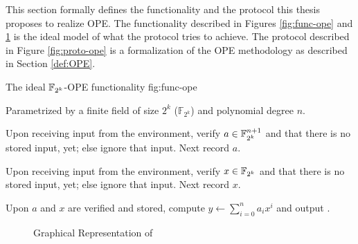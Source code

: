 %
%
\label{sec:protocol}

This section formally defines the functionality \JWfuncSymOPE and the protocol
\JWprotoSymOPE this thesis proposes to realize OPE.  The functionality described
in Figures \ref{fig:func-ope} and \ref{fig:graph-ope} is the ideal model of what
the protocol tries to achieve. The protocol described in Figure
\ref{fig:proto-ope} is a formalization of the OPE methodology as described in
Section \ref{def:OPE}.

\begin{JWfunc}%
  {\JWfuncSymOPE}%
  {The ideal $\mathbb{F}_{2^k}{}$-OPE functionality \JWfuncSymOPE{}}%
  {fig:func-ope}

  Parametrized by a finite field of size $2^k$ ($\mathbb{F}_{2^k}$)
  and polynomial degree $n$.

  \begin{JWfuncSteps}

  \item Upon receiving input  from the environment, verify
    $a \in \mathbb{F}_{2^k}^{n+1}$ and that there is no stored input, yet; else
    ignore that input. Next record $a$.

  \item Upon receiving input  from the environment,
    verify $x \in \mathbb{F}_{2^k}{}$ and that there is no stored input, yet;
    else ignore that input. Next record $x$.

  \item Upon $a$ and $x$ are verified and stored, compute $y \leftarrow
    \sum_{i=0}^n a_ix^i$ and output .

  \end{JWfuncSteps}
\end{JWfunc}

\begin{figure}[ht]

  \centering


  \caption{Graphical Representation of \JWfuncSymOPE}
  \label{fig:graph-ope}

\end{figure}

